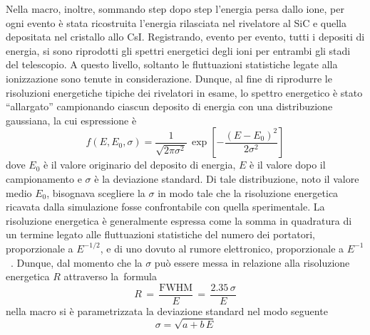 Nella macro, inoltre, sommando step dopo step l'energia persa dallo ione, per ogni evento è stata ricostruita l'energia rilasciata nel rivelatore al SiC e quella depositata nel cristallo allo CsI.
Registrando, evento per evento, tutti i depositi di energia, si sono riprodotti gli spettri energetici degli ioni per entrambi gli stadi del telescopio.
A questo livello, soltanto le fluttuazioni statistiche legate alla ionizzazione sono tenute in considerazione.
Dunque, al fine di riprodurre le risoluzioni energetiche tipiche dei rivelatori in esame, lo spettro energetico è stato ``allargato'' campionando ciascun deposito di energia con una distribuzione gaussiana, la cui espressione è
\begin{equation}
	f(E, E_0, \sigma) = \frac{1}{\sqrt{2 \pi \sigma^2}} \, \exp \left[ - \frac{ \left(E - E_0 \right)^2}{2 {\sigma}^2}  \right]
\end{equation}
dove $E_0$ è il valore originario del deposito di energia, $E$ è il valore dopo il campionamento e $\sigma$ è la deviazione standard.
Di tale distribuzione, noto il valore medio $E_0$, bisognava scegliere la $\sigma$ in modo tale che la risoluzione energetica ricavata dalla simulazione fosse confrontabile con quella sperimentale.
La risoluzione energetica è generalmente espressa come la somma in quadratura di un termine legato alle fluttuazioni statistiche del numero dei portatori, proporzionale a $E^{-1/2}$, e di uno dovuto al rumore elettronico, proporzionale a $E^{-1}$~\cite{knoll:10}.
Dunque, dal momento che la $\sigma$ può essere messa in relazione alla risoluzione energetica $R$ attraverso la~formula
\begin{equation}
	R \,  = \, \frac{\mbox{FWHM}}{E} \, = \, \frac{2.35 \, \sigma}{E}
\end{equation}
nella macro si è parametrizzata la deviazione standard nel modo seguente
\begin{equation}
\sigma = \sqrt{a + b \, E}
\end{equation}
